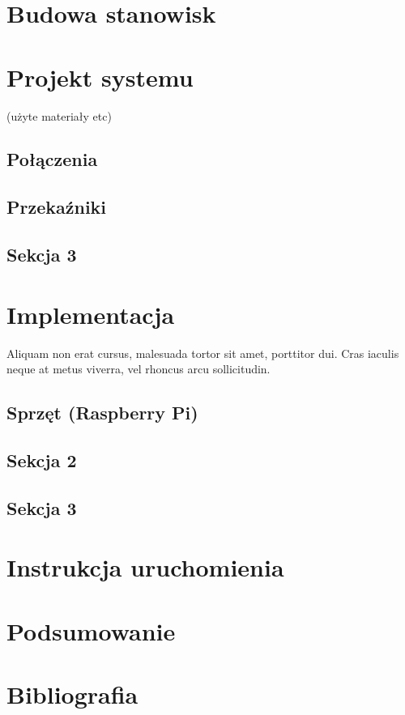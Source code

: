 \documentclass[wmii,inf,mgr]{uwmthesis}
\begin{document}
\chapter{Budowa stanowisk}
\chapter{Projekt systemu}
(użyte materiały etc)
\section{Połączenia}
\section{Przekaźniki}
\section{Sekcja 3}

\chapter{Implementacja}

Aliquam non erat cursus, malesuada tortor sit amet, porttitor dui. Cras iaculis neque at metus viverra, vel rhoncus arcu sollicitudin.
\section{Sprzęt (Raspberry Pi)}
\section{Sekcja 2}
\section{Sekcja 3}
\chapter{Instrukcja uruchomienia}
\chapter{Podsumowanie}
\chapter*{Bibliografia}
\end{document}

